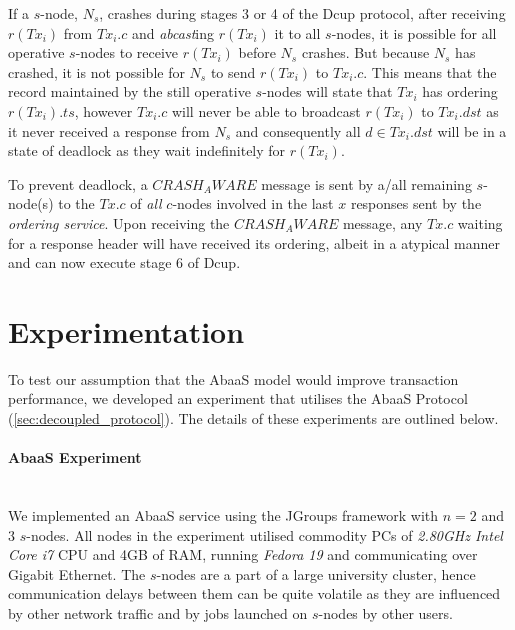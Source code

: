 	If a $s$-node, $N_s$, crashes during stages 3 or 4 of the \textsf{Dcup} protocol, after receiving $r(Tx_i)$ from $Tx_i.c$ and \emph{abcast}ing $r(Tx_i)$ it to all $s$-nodes, it is possible for all operative $s$-nodes to receive $r(Tx_i)$ before $N_s$ crashes.  But because $N_s$ has crashed, it is not possible for $N_s$ to send $r(Tx_i)$ to $Tx_i.c$.  This means that the record maintained by the still operative $s$-nodes will state that $Tx_i$ has ordering $r(Tx_i).ts$, however $Tx_i.c$ will never be able to broadcast $r(Tx_i)$ to $Tx_i.dst$ as it never received a response from $N_s$ and consequently all $d \in Tx_i.dst$ will be in a state of deadlock as they wait indefinitely for $r(Tx_i)$.  
	
	To prevent deadlock, a $CRASH_AWARE$ message is sent by a/all remaining $s$-node(s) to the $Tx.c$ of \emph{all} $c$-nodes involved in the last $x$ responses sent by the \emph{ordering service}.  Upon receiving the $CRASH_AWARE$ message, any $Tx.c$ waiting for a response header will have received its ordering, albeit in a atypical manner and can now execute stage 6 of \textsf{Dcup}.  
	
\section{Experimentation}

To test our assumption that the \textsf{AbaaS} model would improve transaction performance, we developed an experiment that utilises the \textsf{AbaaS} Protocol (\ref{sec:decoupled_protocol}).  The details of these experiments are outlined below. 

\paragraph{AbaaS Experiment} \hspace{0pt} \\
We implemented an \textsf{AbaaS} service using the JGroups\citep{JGroups} framework with $n=2$ and $3$ $s$-nodes.  All nodes in the experiment utilised commodity PCs of \emph{2.80GHz Intel Core i7} CPU and 4GB of RAM, running \emph{Fedora 19} and communicating over Gigabit Ethernet. The $s$-nodes are a part of a large university cluster, hence communication delays between them can be quite volatile as they are influenced by other network traffic and by jobs launched on $s$-nodes by other users.

